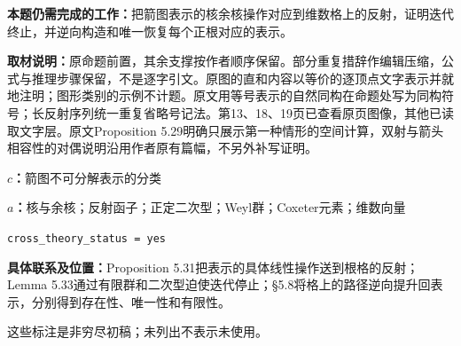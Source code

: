\documentclass[UTF8,11pt,a4paper]{ctexart}
\theoremstyle{definition}\newtheorem*{definition}{Definition}
\theoremstyle{remark}\newtheorem*{remark}{Remark}
\begin{document}
\textbf{本题仍需完成的工作：}把箭图表示的核余核操作对应到维数格上的反射，证明迭代终止，并逆向构造和唯一恢复每个正根对应的表示。

\textbf{取材说明：}原命题前置，其余支撑按作者顺序保留。部分重复措辞作编辑压缩，公式与推理步骤保留，不是逐字引文。原图的直和内容以等价的逐顶点文字表示并就地注明；图形类别的示例不计题。原文用等号表示的自然同构在命题处写为同构符号；长反射序列统一重复省略号记法。第13、18、19页已查看原页图像，其他已读取文字层。原文Proposition 5.29明确只展示第一种情形的空间计算，双射与箭头相容性的对偶说明沿用作者原有篇幅，不另外补写证明。

\textbf{$c$：}箭图不可分解表示的分类

\textbf{$a$：}核与余核；反射函子；正定二次型；Weyl群；Coxeter元素；维数向量

\texttt{cross\_theory\_status = yes}

\textbf{具体联系及位置：}Proposition 5.31把表示的具体线性操作送到根格的反射；Lemma 5.33通过有限群和二次型迫使迭代停止；§5.8将格上的路径逆向提升回表示，分别得到存在性、唯一性和有限性。

这些标注是非穷尽初稿；未列出不表示未使用。
\end{document}
